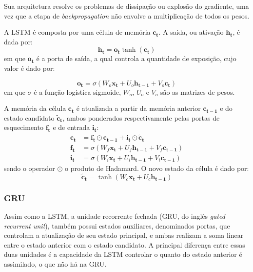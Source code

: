 Sua arquitetura resolve os problemas de dissipação ou explosão do
gradiente, uma vez que a etapa de \textit{backpropagation} não envolve a
multiplicação de todos os pesos.

A LSTM é composta por uma célula de memória $\mathbf{c_t}$. A saída, ou ativação
$\mathbf{h_t}$, é dada por:
\begin{equation}
    \mathbf{h_t} = \mathbf{o_t}\tanh(\mathbf{c_t})
\end{equation}
em que $\mathbf{o_t}$ é a porta de saída, a qual controla a quantidade de
exposição, cujo valor é dado por:

\begin{equation}
    \mathbf{o_t} = \sigma(W_o\mathbf{x_t} + U_o\mathbf{h_{t-1}} + V_o\mathbf{c_t})
\end{equation}
em que $\sigma$ é a função logística sigmoide, $W_o$, $U_o$ e $V_o$ são as
matrizes de pesos.

A memória da célula $\mathbf{c_t}$ é atualizada a partir da memória anterior
$\mathbf{c_{t-1}}$ e do estado candidato $\mathbf{\tilde{c}_t}$, ambos ponderados
respectivamente pelas portas de esquecimento $\mathbf{f_t}$ e de entrada $\mathbf{i_t}$:
\begin{align}
    \mathbf{c_t} &= \mathbf{f_t} \odot \mathbf{c_{t-1}} + \mathbf{i_t} \odot \mathbf{\tilde{c}_t} \\
    \mathbf{f_t} &= \sigma(W_f\mathbf{x_t} + U_f\mathbf{h_{t-1}} + V_f\mathbf{c_{t-1}}) \\
    \mathbf{i_t} &= \sigma(W_i\mathbf{x_t} + U_i\mathbf{h_{t-1}} + V_i\mathbf{c_{t-1}})
\end{align}
sendo o operador $\odot$ o produto
de Hadamard. O novo estado da célula é dado por:
\begin{equation}
    \mathbf{\tilde{c}_t} = \tanh(W_c\mathbf{x_t} + U_c\mathbf{h_{t-1}})
\end{equation}


\subsubsection{GRU}
Assim como a LSTM, a unidade recorrente fechada (GRU, do inglês \textit{gated
recurrent unit}), também possui estados auxiliares, denominados portas, que
controlam a atualização de seu estado principal, e ambas realizam a soma linear
entre o estado anterior com o estado candidato. A principal diferença entre
essas duas unidades é a capacidade da LSTM controlar o quanto do estado anterior
é assimilado, o que não há na GRU.

